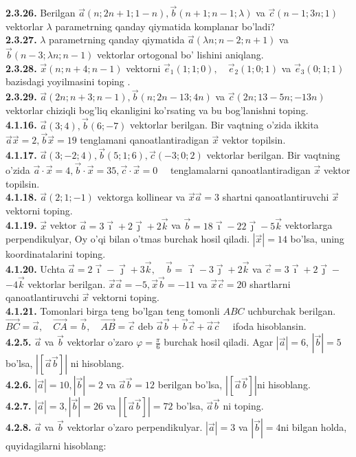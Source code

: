\documentclass[10pt]{article}
\begin{document}
\textbf{2.3.26.} Berilgan $\vec{a}(n ; 2 n+1 ; 1-n), \vec{b}(n+1 ; n-1 ; \lambda)$ va $\vec{c}(n-1 ; 3 n ; 1)$ vektorlar $\lambda$ parametrning qanday qiymatida komplanar bo'ladi?\\
\textbf{2.3.27.} $\lambda$ parametrning qanday qiymatida $\vec{a}(\lambda n ; n-2 ; n+1)$ va $\vec{b}(n-3 ; \lambda n ; n-1)$ vektorlar ortogonal bo' lishini aniqlang.\\
\textbf{2.3.28.} $\vec{x}(n ; n+4 ; n-1)$ vektorni $\vec{e}_{1}(1 ; 1 ; 0), \quad \vec{e}_{2}(1 ; 0 ; 1)$ va $\vec{e}_{3}(0 ; 1 ; 1)$ bazisdagi yoyilmasini toping .\\
\textbf{2.3.29.} $\vec{a}(2 n ; n+3 ; n-1), \vec{b}(n ; 2 n-13 ; 4 n)$ va $\vec{c}(2 n ; 13-5 n ;-13n)$ vektorlar chiziqli bog'liq ekanligini ko'rsating va bu bog'lanishni toping.\\
\textbf{4.1.16.} $\vec{a}(3 ; 4), \vec{b}(6 ;-7)$ vektorlar berilgan. Bir vaqtning o'zida ikkita $\vec{a} \vec{x}=2, \vec{b} \vec{x}=19$ tenglamani qanoatlantiradigan $\vec{x}$ vektor topilsin.\\
\textbf{4.1.17.} $\vec{a}(3 ;-2 ; 4), \vec{b}(5 ; 1 ; 6), \vec{c}(-3 ; 0 ; 2)$ vektorlar berilgan. Bir vaqtning o'zida $\vec{a} \cdot \vec{x}=4, \vec{b} \cdot \vec{x}=35, \vec{c} \cdot \vec{x}=0 \quad$ tenglamalarni qanoatlantiradigan $\vec{x}$ vektor topilsin.\\
\textbf{4.1.18.} $\vec{a}(2 ; 1 ;-1)$ vektorga kollinear va $\vec{x} \vec{a}=3$ shartni qanoatlantiruvchi $\vec{x}$ vektorni toping.\\
\textbf{4.1.19.} $\vec{x}$ vektor $\vec{a}=3 \vec{\imath}+2 \vec{\jmath}+2 \vec{k}$ va $\vec{b}=18 \vec{\imath}-22 \vec{\jmath}-5 \vec{k}$ vektorlarga perpendikulyar, Oy o'qi bilan o'tmas burchak hosil qiladi. $|\vec{x}|=14$ bo'lsa, uning koordinatalarini toping.\\
\textbf{4.1.20.} Uchta $\vec{a}=2 \vec{\imath}-\vec{\jmath}+3 \vec{k}, \quad \vec{b}=\vec{\imath}-3 \vec{\jmath}+2 \vec{k}$ va $\vec{c}=3 \vec{\imath}+2 \vec{\jmath}-$ $-4 \vec{k}$ vektorlar berilgan. $\vec{x} \vec{a}=-5, \vec{x} \vec{b}=-11$ va $\vec{x} \vec{c}=20$ shartlarni qanoatlantiruvchi $\vec{x}$ vektorni toping.\\
\textbf{4.1.21.} Tomonlari birga teng bo'lgan teng tomonli $A B C$ uchburchak berilgan. $\overrightarrow{B C}=\vec{a}, \quad \overrightarrow{C A}=\vec{b}, \quad \overrightarrow{A B}=\vec{c}$ deb $\vec{a} \vec{b}+\vec{b} \vec{c}+\vec{a} \vec{c} \quad$ ifoda hisoblansin.\\
\textbf{4.2.5.} $\vec{a}$ va $\vec{b}$ vektorlar o'zaro $\varphi=\frac{\pi}{6}$ burchak hosil qiladi. Agar $|\vec{a}|=6$, $|\vec{b}|=5$ bo'lsa, $|[\vec{a} \vec{b}]|$ ni hisoblang.\\
\textbf{4.2.6.} $|\vec{a}|=10,|\vec{b}|=2$ va $\vec{a} \vec{b}=12$ berilgan bo'lsa, $|[\vec{a} \vec{b}]| \mathrm{ni}$ hisoblang.\\
\textbf{4.2.7.} $|\vec{a}|=3,|\vec{b}|=26$ va $|[\vec{a} \vec{b}]|=72$ bo'lsa, $\vec{a} \vec{b}$ ni toping.\\
\textbf{4.2.8.} $\vec{a}$ va $\vec{b}$ vektorlar o'zaro perpendikulyar. $|\vec{a}|=3$ va $|\vec{b}|=4 \mathrm{ni}$ bilgan holda, quyidagilarni hisoblang:
\end{document}

